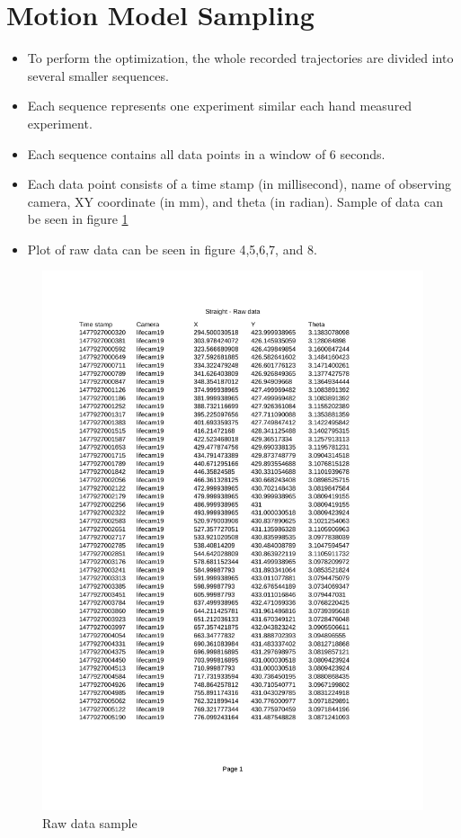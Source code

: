 \documentclass[paper=a4, fontsize=11pt]{scrartcl} %
\begin{document}
\section{Motion Model Sampling}
    \begin{itemize}
        \item To perform the optimization, the whole recorded trajectories are divided into several smaller sequences.
        \item Each sequence represents one experiment similar each hand measured experiment.
        \item Each sequence contains all data points in a window of 6 seconds.
        \item Each data point consists of a time stamp (in millisecond), name of observing camera, XY coordinate (in mm), and theta (in radian). Sample of data can be seen in figure \ref{Raw_data}
        \item Plot of raw data can be seen in figure 4,5,6,7, and 8.
    \end{itemize}

    \begin{figure}[h!]
        \begin{center}
            \setlength{\fboxsep}{0.5pt} %
            \setlength{\fboxrule}{0.5pt}
            \includegraphics[width=12cm,fbox]{images/Raw_data}
            \caption{Raw data sample}
            \label{Raw_data}
        \end{center}
    \end{figure}
\end{document}
